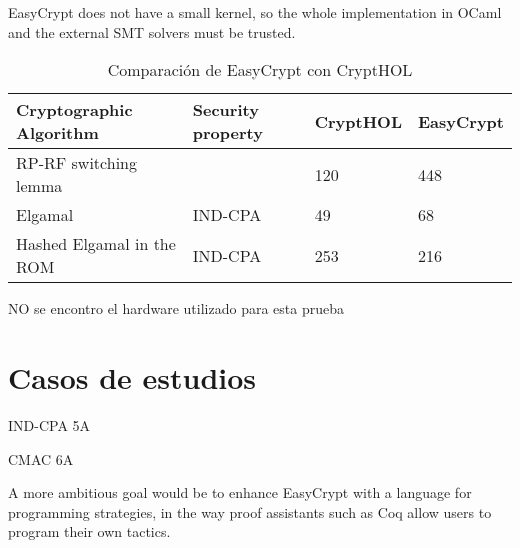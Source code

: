 \documentclass[runningheads,a4paper]{llncs}
\begin{document}
EasyCrypt
does not have a small kernel, so the whole implementation in OCaml and the
external SMT solvers must be trusted.


\begin{table}
  \caption{Comparación de EasyCrypt con CryptHOL}
  \label{tab:simple1}
  \centering
  \begin{tabular}{ |p{4cm}|p{1.5cm}|p{1.5cm}|p{1.5cm}|  }
 \hline
 Cryptographic Algorithm & Security property & CryptHOL & EasyCrypt\\\cline{1-4}
 \hline
 RP-RF switching lemma &  & 120 & 448\\
 Elgamal & IND-CPA & 49  & 68\\
 Hashed Elgamal in the ROM & IND-CPA & 253 &  216\\
 \hline
\end{tabular}
\end{table}

NO se encontro el hardware utilizado para esta prueba


\section{Casos de estudios}
IND-CPA  5A

CMAC 6A

A more ambitious goal
would be to enhance EasyCrypt with a language for programming strategies, in
the way proof assistants such as Coq allow users to program their own tactics.
\end{document}

